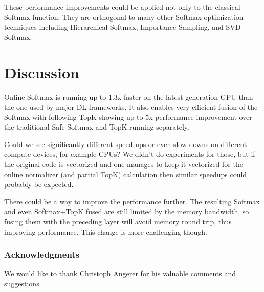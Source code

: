 These performance improvements could be applied not only to the classical Softmax function; They are orthogonal to many other Softmax optimization techniques including Hierarchical Softmax, Importance Sampling, and SVD-Softmax.

\section{Discussion}

Online Softmax is running up to $1.3$x faster on the latest generation GPU than the one used by major DL frameworks. It also enables very efficient fusion of the Softmax with following TopK showing up to $5$x performance improvement over the traditional Safe Softmax and TopK running separately.

Could we see significantly different speed-ups or even slow-downs on different compute devices, for example CPUs? We didn't do experiments for those, but if the original code is vectorized and one manages to keep it vectorized for the online normalizer (and partial TopK) calculation then similar speedups could probably be expected.

There could be a way to improve the performance further. The resulting Softmax and even Softmax+TopK fused are still limited by the memory bandwidth, so fusing them with the preceding layer will avoid memory round trip, thus improving performance. This change is more challenging though.

\subsubsection*{Acknowledgments}

We would like to thank Christoph Angerer for his valuable comments and suggestions.


